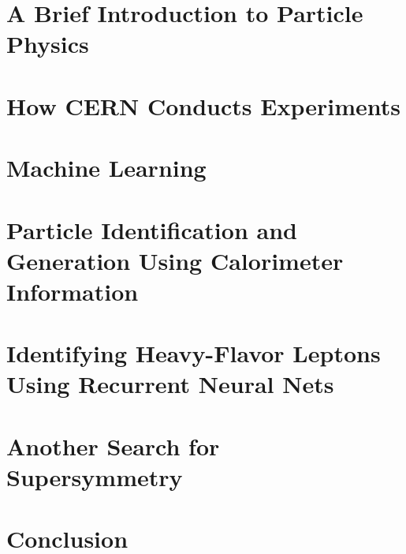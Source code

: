 \documentclass[draftthesis,fancy,edeposit]{uiuc_thesis_template}
\begin{document}


\part{A Brief Introduction to Particle Physics}




\part{How CERN Conducts Experiments}



\part{Machine Learning}


\part{Particle Identification and Generation Using Calorimeter Information}


\part{Identifying  Heavy-Flavor  Leptons  Using  Recurrent  Neural Nets}


\part{Another Search for Supersymmetry}


\part{Conclusion}


\clearpage
\appendix









\backmatter

\printbibliography
\end{document}
